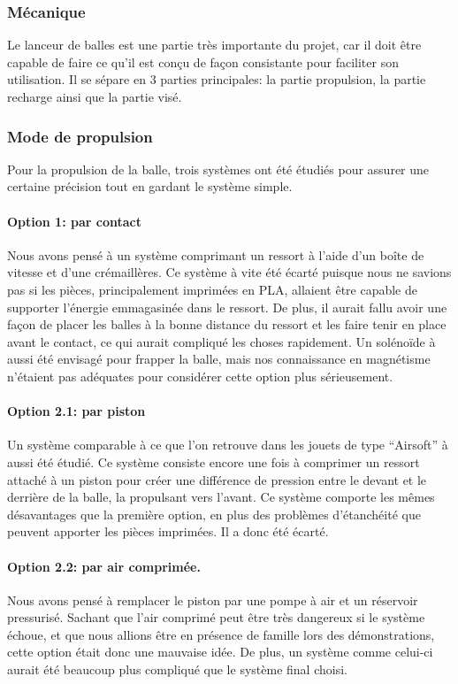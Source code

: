 \subsubsection{Mécanique}

Le lanceur de balles est une partie très importante du projet,
car il doit être capable de faire ce qu’il est conçu de façon consistante pour faciliter son utilisation.
Il se sépare en 3 parties principales:
la partie propulsion,
la partie recharge ainsi que
la partie visé.

\subsubsection{Mode de propulsion}
Pour la propulsion de la balle, trois systèmes ont été étudiés pour assurer une certaine précision tout en gardant le système simple.

\paragraph{Option 1: par contact}
Nous avons pensé à un système comprimant un ressort à l’aide d’un boîte de vitesse et d’une crémaillères.
Ce système à vite été écarté puisque nous ne savions pas si les pièces, principalement imprimées en PLA, allaient être capable de supporter l'énergie emmagasinée dans le ressort.
De plus, il aurait fallu avoir une façon de placer les balles à la bonne distance du ressort et les faire tenir en place avant le contact, ce qui aurait compliqué les choses rapidement.
Un solénoïde à aussi été envisagé pour frapper la balle, mais nos connaissance en magnétisme n’étaient pas adéquates pour considérer cette option plus sérieusement.


\paragraph{Option 2.1: par piston}
Un système comparable à ce que l’on retrouve dans les jouets de type “Airsoft” à aussi été étudié.
Ce système consiste encore une fois à comprimer un ressort attaché à un piston pour créer une différence de pression entre le devant et le derrière de la balle, la propulsant vers l’avant.
Ce système comporte les mêmes désavantages que la première option, en plus des problèmes d’étanchéité que peuvent apporter les pièces imprimées.
Il a donc été écarté.

\paragraph{Option 2.2: par air comprimée.}
Nous avons pensé à remplacer le piston par une pompe à air et un réservoir pressurisé.
Sachant que l’air comprimé peut être très dangereux si le système échoue, et que nous allions être en présence de famille lors des démonstrations, cette option était donc une mauvaise idée.
De plus, un système comme celui-ci aurait été beaucoup plus compliqué que le système final choisi.

